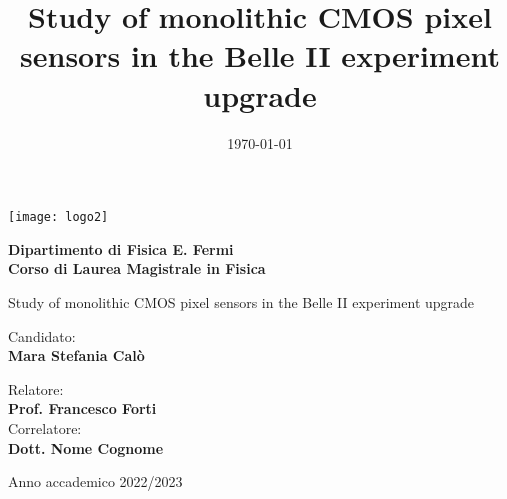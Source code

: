 \documentclass[10pt,a4paper]{report}
\title{Study of monolithic CMOS pixel sensors in the Belle II experiment upgrade}
\date{\today}
\begin{document}
\begin{titlepage}
    \begin{center}
        \texttt{[image: logo2]}
        \vspace*{1.2cm}

        \LARGE

        \textbf{ \large Dipartimento di Fisica E. Fermi \\ Corso di Laurea Magistrale in Fisica}

        \vspace*{2.5cm}
        
        \huge
        Study of monolithic CMOS pixel sensors in the Belle II experiment upgrade

        \normalsize
        \vspace*{4cm}

        
        
        \begin{minipage}[t]{0.47\textwidth}
	       {Candidato:} \hspace{-0.9em} \vspace{0.3em} \\
              {\large \textbf{Mara Stefania Calò}} %
        \end{minipage}
        \hfill
        \begin{minipage}[t]{0.47\textwidth}\raggedleft
	       {Relatore:} \vspace{0.3em} \\
              {\large \textbf{Prof. Francesco Forti}} \vspace{1em}  \\
              {Correlatore:} \vspace{0.3em} \\
              {\large \textbf{Dott. Nome Cognome}}
        \end{minipage}

        \vfill
        Anno accademico 2022/2023
            
    \end{center}
\end{titlepage}




\doublespacing
\tableofcontents
\singlespacing
\end{document}

